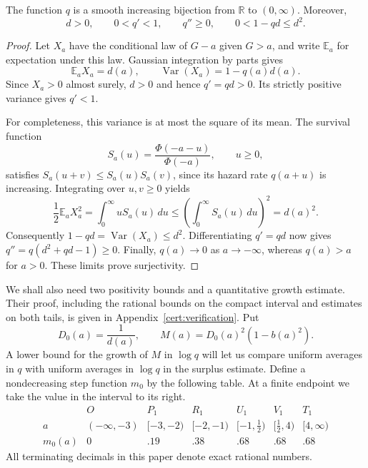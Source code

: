 \begin{lemma}\label{tr:q-properties}
The function $q$ is a smooth increasing bijection from $\mathbb R$ to
$(0,\infty)$.  Moreover,
\[
 d>0,\qquad 0<q'<1,\qquad q''\ge0,
 \qquad 0<1-qd\le d^2.
\]
\end{lemma}
\begin{proof}
Let $X_a$ have the conditional law of $G-a$ given $G>a$, and write
$\mathbb E_a$ for expectation under this law.  Gaussian integration
by parts gives
\[
 \mathbb E_a X_a=d(a),\qquad
 \operatorname{Var}(X_a)=1-q(a)d(a).
\]
Since $X_a>0$ almost surely, $d>0$ and hence $q'=qd>0$.
Its strictly positive variance gives $q'<1$.

For completeness, this variance is at most the square of its mean.
The survival function
\[
 S_a(u)=\frac{\Phi(-a-u)}{\Phi(-a)},\qquad u\ge0,
\]
satisfies $S_a(u+v)\le S_a(u)S_a(v)$, since its hazard rate $q(a+u)$
is increasing.  Integrating over $u,v\ge0$ yields
\[
 \frac12\mathbb E_a X_a^2
 =\int_0^\infty uS_a(u)\,du
 \le\left(\int_0^\infty S_a(u)\,du\right)^2=d(a)^2.
\]
Consequently $1-qd=\operatorname{Var}(X_a)\le d^2$.  Differentiating
$q'=qd$ now gives
$q''=q(d^2+qd-1)\ge0$.  Finally, $q(a)\to0$ as $a\to-\infty$,
whereas $q(a)>a$ for $a>0$.  These limits prove surjectivity.
\end{proof}

We shall also need two positivity bounds and a quantitative growth estimate.
Their proof, including
the rational bounds on the compact interval and estimates on both tails,
is given in Appendix~\ref{cert:verification}.
Put
\begin{equation}\label{tr:M-definition}
 D_0(a)=\frac1{d(a)},\qquad M(a)=D_0(a)^2(1-b(a)^2).
\end{equation}
A lower bound for the growth of $M$ in $\log q$ will let us compare
uniform averages in $q$ with uniform averages in $\log q$ in the
surplus estimate.
Define a nondecreasing step function $m_0$ by the following table.  At a
finite endpoint we take the value in the interval to its right.
\begin{equation}\label{tr:bins}
\begin{array}{c|rrrrrr}
 &O&P_1&R_1&U_1&V_1&T_1\\\hline
 a&(-\infty,-3)&[-3,-2)&[-2,-1)&[-1,\tfrac12)&[\tfrac12,4)&[4,\infty)\\
 m_0(a)&0&.19&.38&.68&.68&.68
\end{array}
\end{equation}
All terminating decimals in this paper denote exact rational numbers.

